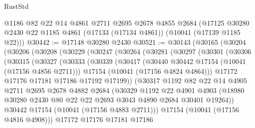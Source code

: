 \begin{lexlean}{RustStd}
\begin{coremodule}
    @1186
    @82
    @22
    @14
    @4861
    @2711
    @2695
    @2678
    @4855
    @2684
    (@17125 @30280 @2430 @22 @1185 @4861 (@17133 (@17134 @4861)) (@10041 (@17139 @1185 @22)))
@30442 := @17148 @30280 @2430
@30521 := @30143
    (@30165
      (@30204
        (@30206
          (@30208
            (@30229
              (@30247
                (@30264
                  (@30281
                    (@30297
                      (@30301
                        (@30306
                          (@30315
                            (@30327
                              (@30333
                                (@30339
                                  (@30417
                                    (@30440 @30442 @17154 (@10041 (@17156 @4856 @2711)))
                                    @17154
                                    (@10041 (@17156 @4824 @4864)))
                                  @17172
                                  @17176
                                  @17181
                                  @17186
                                  @17192
                                  @17199))
                              (@30317
                                @1192
                                @82
                                @22
                                @14
                                @4905
                                @2711
                                @2695
                                @2678
                                @4882
                                @2684
                                (@30329
                                  @1192
                                  @22
                                  @4901
                                  @4903
                                  (@18980
                                    @30280
                                    @2430
                                    @80
                                    @22
                                    @22
                                    @2693
                                    @3043
                                    @4890
                                    @2684
                                    @30401
                                    @19264))
                                @30442
                                @17154
                                (@10041 (@17156 @4883 @2711)))
                              @17154
                              (@10041 (@17156 @4816 @4908)))
                            @17172
                            @17176
                            @17181
                            @17186

\end{coremodule}
\end{lexlean}
